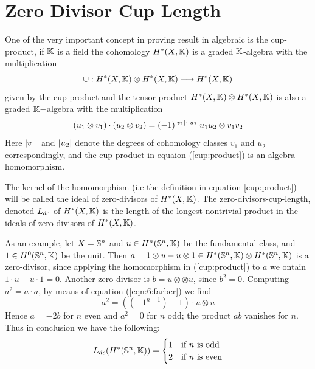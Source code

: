 \section{Zero Divisor Cup Length}

One of the very important concept in proving result in algebraic is the cup-product, if $\mathbb{K}$ is a field the cohomology $H^*(X, \mathbb{K})$ is a graded $\mathbb{K}$-algebra with the multiplication
\begin{equation}\label{cup:product}
    \cup: H^*(X, \mathbb{K}) \otimes H^*(X, \mathbb{K}) \longrightarrow H^*(X, \mathbb{K})
\end{equation}
given by the cup-product and the tensor product $H^*(X, \mathbb{K}) \otimes H^*(X, \mathbb{K})$ is also a graded $\mathbb{K}-$algebra with the multiplication
\begin{equation}\label{eqn:6:farber}
    (u_1 \otimes v_1) \cdot (u_2 \otimes v_2) = (-1)^{\lvert v_1\rvert \cdot \lvert u_2\rvert} u_1 u_2 \otimes v_1v_2
\end{equation}
Here $\lvert v_1\rvert$ and $\lvert u_2\rvert$ denote the degrees of cohomology classes $v_1$ and $u_2$ correspondingly, and the cup-product in equaion (\ref{cup:product}) is an algebra homomorphism.

\begin{defn}
    The kernel of the homomorphism (i.e the definition in equation \ref{cup:product}) will be called the ideal of zero-divisors of $H^*(X, \mathbb{K})$. The zero-divisors-cup-length, denoted $L_{dc}$ of $H^*(X, \mathbb{K})$ is the length of the longest nontrivial product in the ideals of zero-divisors of $H^*(X, \mathbb{K})$.
\end{defn}
As an example, let $X = \mathbb{S}^n$ and $u \in H^n(\mathbb{S}^n, \mathbb{K})$ be the fundamental class, and $1 \in H^0(\mathbb{S}^n, \mathbb{K})$ be the unit. Then $a = 1 \otimes u - u \otimes 1 \in H^*(\mathbb{S}^n, \mathbb{K}) \otimes H^*(\mathbb{S}^n, \mathbb{K})$ is a zero-divisor, since applying the homomorphism in (\ref{cup:product}) to $a$ we ontain $1 \cdot u - u\cdot 1 = 0$. Another zero-divisor is $b = u \otimes \otimes u$, since $b^2 = 0$. Computing $a^2 = a \cdot a$, by means of equation (\ref{eqn:6:farber}) we find
\[
    a^2 = \left((-1^{n-1}) - 1\right) \cdot u \otimes u
\]
Hence $a = - 2b$ for $n$ even and $a^2 = 0$ for $n$ odd; the product $ab$ vanishes for $n$. Thus in conclusion we have the following:
\begin{equation}\label{zdcl:of:sphere}
    L_{dc}(H^*(\mathbb{S}^n, \mathbb{K})) = \begin{cases}
        1 & \text{if $n$ is odd}  \\
        2 & \text{if $n$ is even}
    \end{cases}
\end{equation}



